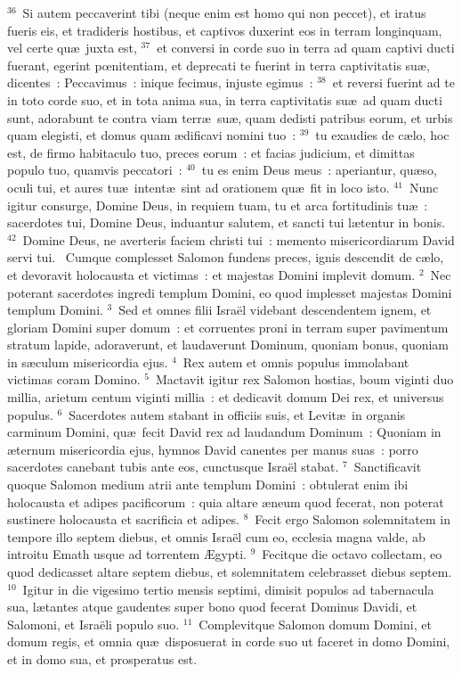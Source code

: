 ${}^{36}$~Si autem peccaverint tibi (neque enim est homo qui non peccet), et iratus fueris eis, et tradideris hostibus, et captivos duxerint eos in terram longinquam, vel certe qu\ae\ juxta est,
${}^{37}$~et conversi in corde suo in terra ad quam captivi ducti fuerant, egerint pœnitentiam, et deprecati te fuerint in terra captivitatis su\ae , dicentes~: Peccavimus~: inique fecimus, injuste egimus~:
${}^{38}$~et reversi fuerint ad te in toto corde suo, et in tota anima sua, in terra captivitatis su\ae\ ad quam ducti sunt, adorabunt te contra viam terr\ae\ su\ae , quam dedisti patribus eorum, et urbis quam elegisti, et domus quam \ae dificavi nomini tuo~:
${}^{39}$~tu exaudies de c\ae lo, hoc est, de firmo habitaculo tuo, preces eorum~: et facias judicium, et dimittas populo tuo, quamvis peccatori~:
${}^{40}$~tu es enim Deus meus~: aperiantur, qu\ae so, oculi tui, et aures tu\ae\ intent\ae\ sint ad orationem qu\ae\ fit in loco isto.
${}^{41}$~Nunc igitur consurge, Domine Deus, in requiem tuam, tu et arca fortitudinis tu\ae~: sacerdotes tui, Domine Deus, induantur salutem, et sancti tui l\ae tentur in bonis.
${}^{42}$~Domine Deus, ne averteris faciem christi tui~: memento misericordiarum David servi tui.
~Cumque complesset Salomon fundens preces, ignis descendit de c\ae lo, et devoravit holocausta et victimas~: et majestas Domini implevit domum.
${}^{2}$~Nec poterant sacerdotes ingredi templum Domini, eo quod implesset majestas Domini templum Domini.
${}^{3}$~Sed et omnes filii Isra\"el videbant descendentem ignem, et gloriam Domini super domum~: et corruentes proni in terram super pavimentum stratum lapide, adoraverunt, et laudaverunt Dominum, quoniam bonus, quoniam in s\ae culum misericordia ejus.
${}^{4}$~Rex autem et omnis populus immolabant victimas coram Domino.
${}^{5}$~Mactavit igitur rex Salomon hostias, boum viginti duo millia, arietum centum viginti millia~: et dedicavit domum Dei rex, et universus populus.
${}^{6}$~Sacerdotes autem stabant in officiis suis, et Levit\ae\ in organis carminum Domini, qu\ae\ fecit David rex ad laudandum Dominum~: Quoniam in \ae ternum misericordia ejus, hymnos David canentes per manus suas~: porro sacerdotes canebant tubis ante eos, cunctusque Isra\"el stabat.
${}^{7}$~Sanctificavit quoque Salomon medium atrii ante templum Domini~: obtulerat enim ibi holocausta et adipes pacificorum~: quia altare \ae neum quod fecerat, non poterat sustinere holocausta et sacrificia et adipes.
${}^{8}$~Fecit ergo Salomon solemnitatem in tempore illo septem diebus, et omnis Isra\"el cum eo, ecclesia magna valde, ab introitu Emath usque ad torrentem \AE gypti.
${}^{9}$~Fecitque die octavo collectam, eo quod dedicasset altare septem diebus, et solemnitatem celebrasset diebus septem.
${}^{10}$~Igitur in die vigesimo tertio mensis septimi, dimisit populos ad tabernacula sua, l\ae tantes atque gaudentes super bono quod fecerat Dominus Davidi, et Salomoni, et Isra\"eli populo suo.
${}^{11}$~Complevitque Salomon domum Domini, et domum regis, et omnia qu\ae\ disposuerat in corde suo ut faceret in domo Domini, et in domo sua, et prosperatus est.


